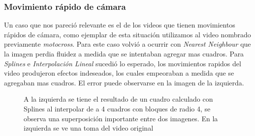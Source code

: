 \subsubsection{Movimiento rápido de cámara}

Un caso que nos pareció relevante es el de los videos que tienen movimientos rápidos de cámara, como ejemplar de esta situación utilizamos al video nombrado previamente \textit{motocross}. Para este caso volvió a ocurrir con \textit{Nearest Neighbour} que la imagen perdia fluidez a medida que se intentaban agregar mas cuadros. Para  \textit{Splines} e \textit{Interpolación Lineal}  sucedió lo esperado, los movimientos rapidos del video produjeron efectos indeseados, los cuales empeoraban a medida que se agregaban mas cuadros. El error puede observarse en la imagen de la izquierda.

\begin{figure}[H]
\centering
\begin{minipage}{0.48\textwidth}
\end{minipage}%
\hfill
\begin{minipage}{0.48\textwidth}   

\end{minipage}
\caption{\footnotesize A la izquierda se tiene el resultado de un cuadro calculado con Splines al interpolar de a 4 cuadros con bloques de radio 4, se observa una superposición importante entre dos imagenes. En la izquierda se ve una toma del video original}
\end{figure}

